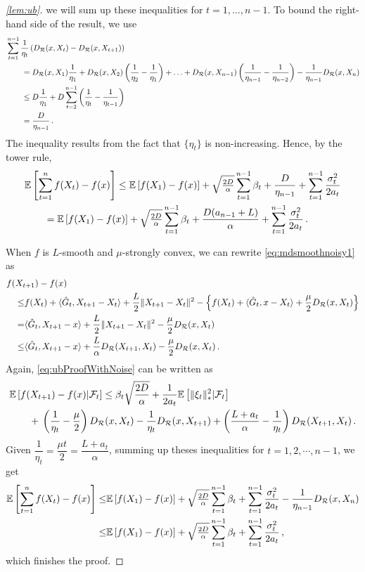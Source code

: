 \begin{proof}[\cref{lem:ub}]
we will sum up these inequalities for $t=1,\dots,n-1$.
To bound the right-hand side of the result, we use
\begin{align*}
\MoveEqLeft \sum_{t=1}^{n-1} \frac{1}{\eta_t} \left(\DR(x,X_t)-\DR(x,X_{t+1})\right)
 \\
&= \DR(x,X_1) \frac{1}{\eta_1} + \DR(x,X_2) \left(\frac{1}{\eta_2}-\frac{1}{\eta_1}\right)
+ \ldots+\DR(x,X_{n-1}) \left(\frac{1}{\eta_{n-1}} -\frac{1}{\eta_{n-2}}\right)- \frac{1}{\eta_{n-1}} \DR(x,X_n)\\
& \le D \frac{1}{\eta_1} + D \sum_{t=2}^{n-1} \left(\frac1{\eta_{t}}-\frac1{\eta_{t-1}}\right)\\
& = \frac{D}{\eta_{n-1}}\,.
\end{align*}
The inequality results from the fact that $\{\eta_t\}$ is non-increasing.
Hence, by the tower rule,
\begin{align*}
\MoveEqLeft \EE{ \sum_{t=1}^n f(X_t) - f(x) }
\le
  \EE{f(X_1)-f(x)} + \sqrt{\tfrac{2D}{\alpha}} \sum_{t=1}^{n-1} \beta_t +
	   \frac{D}{\eta_{n-1}} +
	  \sum_{t=1}^{n-1}\frac{\sigma_t^2}{2a_t}\\
&=
  \EE{f(X_1)-f(x)} + \sqrt{\tfrac{2D}{\alpha}} \sum_{t=1}^{n-1} \beta_t +
	   \frac{D(a_{n-1}+L)}{\alpha} +
	  \sum_{t=1}^{n-1}\frac{\sigma_t^2}{2a_t}\,.
\end{align*}

When $f$ is $L$-smooth and $\mu$-strongly convex,  we can rewrite \eqref{eq:mdsmoothnoisy1} as
\begin{align*}
\MoveEqLeft
f(X_{t+1}) - f(x) \nonumber\\
 \le& f(X_t) + \ip{ \hat{G}_t, X_{t+1}-X_t } + \frac{L}{2} \norm{X_{t+1}-X_t}^2 - \left\{ f(X_t) + \ip{ \hat{G}_t, x-X_t}+\dfrac{\mu}{2}\DR(x, X_t) \right\} \nonumber \\
 =& \ip{\hat{G}_t, X_{t+1} - x } +  \frac{L}{2} \norm{X_{t+1}-X_t}^2-\dfrac{\mu}{2}\DR(x, X_t) \nonumber\\
 \le& \ip{\hat{G}_t,X_{t+1}-x} + \frac{L}{\alpha} D_{\mathcal{R}}(X_{t+1},X_t)-\dfrac{\mu}{2}\DR(x, X_t)\,.
\end{align*}
Again, \eqref{eq:ubProofWithNoise} can be written as
\begin{align*}
\MoveEqLeft \EE{f(X_{t+1}) - f(x) |\F_{t} }
\le
 \beta_t \sqrt{ \frac{2D}{\alpha} }+
\frac{1}{2a_t}  \EE{\norm{\xi_t}_*^2|\F_{t}}\\
&+{}\left(\dfrac{1}{\eta_t}-\dfrac{\mu}{2}  \right)\DR(x,X_t)-\dfrac{1}{\eta_t}\DR(x,X_{t+1})
+\left( \dfrac{L+a_t}{\alpha}-\dfrac{1}{\eta_t} \right)\DR(X_{t+1},X_t) \,.
\end{align*}
Given $\dfrac{1}{\eta_t}=\dfrac{\mu t}{2}=\dfrac{L+a_t}{\alpha}$, summing up theses inequalities for $t=1,2,\cdots, n-1$, we get
\begin{align*}
 \mathbb{E}\left[ \sum_{t=1}^n f(X_t) - f(x) \right]
\le&
  \mathbb{E}\left[f(X_1)-f(x)\right] + \sqrt{\tfrac{2D}{\alpha}} \sum_{t=1}^{n-1} \beta_t +
	  \sum_{t=1}^{n-1}\frac{\sigma_t^2}{2a_t}-\dfrac{1}{\eta_{n-1}}D_{\mathcal{R}}(x,X_{n})\\
\le&
  \mathbb{E}\left[f(X_1)-f(x)\right] + \sqrt{\tfrac{2D}{\alpha}} \sum_{t=1}^{n-1} \beta_t +
	  \sum_{t=1}^{n-1}\frac{\sigma_t^2}{2a_t}\,,
\end{align*}
which finishes the proof.
\end{proof}
